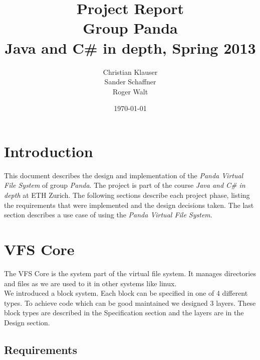 \documentclass[a4paper,12pt]{article}
\title{
Project Report \\ 
Group Panda \\
\vspace{5mm}
\large Java and C\# in depth, Spring 2013
}
\author{
Christian Klauser \\
Sander Schaffner \\
Roger Walt
}
\date{\today}
\begin{document}
\maketitle

\section{Introduction}

This document describes the design and implementation of the \emph{Panda Virtual File System} of group \emph{Panda}. The project is part of the course \emph{Java and C\# in depth} at ETH Zurich. The following sections describe each project phase, listing the requirements that were implemented and the design decisions taken. The last section describes a use case of using the \emph{Panda Virtual File System}.


\section{VFS Core}

The VFS Core is the system part of the virtual file system. It manages directories and files as we are used to it in other systems like linux.\\

We introduced a block system. Each block can be specified in one of 4 different types. To achieve code which can be good maintained we designed 3 layers. These block types are described in the Specification section and the layers are in the Design section.

\subsection{Requirements}
\end{document}
